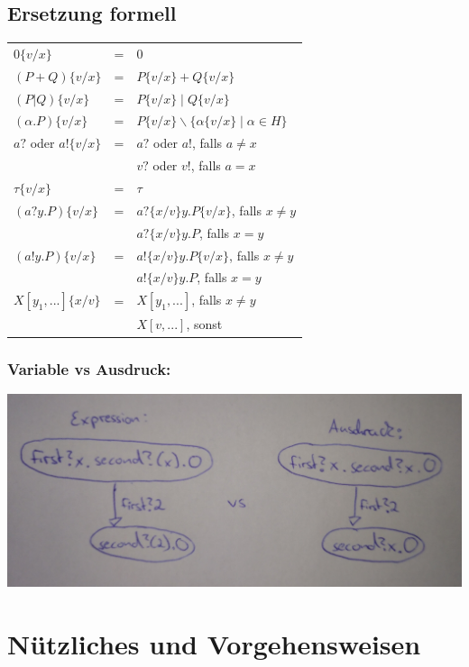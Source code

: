 \documentclass[a4paper,10pt, oneside]{book}
\begin{document}
\subsection{Ersetzung formell}
\begin{tabular}{l c l}
 $0\{v/x\}$ & = & 0\\
 $(P + Q) \{v/x\}$ & = & $P\{v/x\} + Q\{v/x\}$\\
 $(P | Q) \{v/x\}$ & = & $P\{v/x\} \; | \; Q\{v/x\}$\\
 $(\alpha.P) \{v/x\}$ & = & $P\{v/x\} \backslash \{\alpha \{v/x\} \; | \; \alpha \in H\}$\\
 $a?$ oder $a! \{v/x\}$ & = & $a?$ oder $a!$, falls $ a \neq x$\\
 & & $v?$ oder $v!$, falls $a = x$\\
 $\tau \{v/x\}$ & = & $\tau$\\
 $(a?y.P) \{v/x\}$ & = & $a? \{x/v\}y.P\{v/x\}$, falls $x \neq y$\\ 
 & & $a? \{x/v\}y.P$, falls $x = y$\\ 
 $(a!y.P) \{v/x\}$ & = & $a! \{x/v\}y.P\{v/x\}$, falls $x \neq y$\\ 
 & & $a! \{x/v\}y.P$, falls $x = y$\\ 
 $X[y_1,...] \{x/v\}$ & = & $X[y_1,...]$, falls $x \neq y$\\
 & & $X[v,...]$, sonst
\end{tabular}

\subsubsection*{Variable vs Ausdruck:}
\begin{center}
 \includegraphics[scale=0.08]{AusdruckVSExpression}
\end{center}


\section{Nützliches und Vorgehensweisen}
\end{document}
